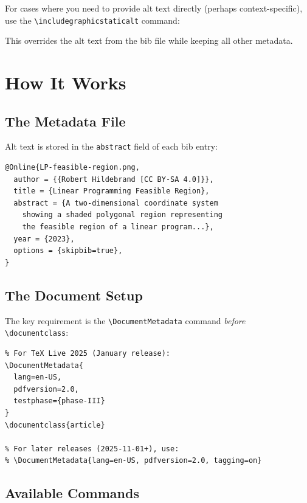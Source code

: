 \documentclass[12pt,letterpaper]{article}
\begin{document}
For cases where you need to provide alt text directly (perhaps context-specific),
use the \verb|\includegraphicstaticalt| command:


This overrides the alt text from the bib file while keeping all other metadata.

\section{How It Works}

\subsection{The Metadata File}

Alt text is stored in the \texttt{abstract} field of each bib entry:

\begin{verbatim}
@Online{LP-feasible-region.png,
  author = {{Robert Hildebrand [CC BY-SA 4.0]}},
  title = {Linear Programming Feasible Region},
  abstract = {A two-dimensional coordinate system
    showing a shaded polygonal region representing
    the feasible region of a linear program...},
  year = {2023},
  options = {skipbib=true},
}
\end{verbatim}

\subsection{The Document Setup}

The key requirement is the \verb|\DocumentMetadata| command \emph{before}
\verb|\documentclass|:

\begin{verbatim}
% For TeX Live 2025 (January release):
\DocumentMetadata{
  lang=en-US,
  pdfversion=2.0,
  testphase={phase-III}
}
\documentclass{article}

% For later releases (2025-11-01+), use:
% \DocumentMetadata{lang=en-US, pdfversion=2.0, tagging=on}
\end{verbatim}

\subsection{Available Commands}
\end{document}
